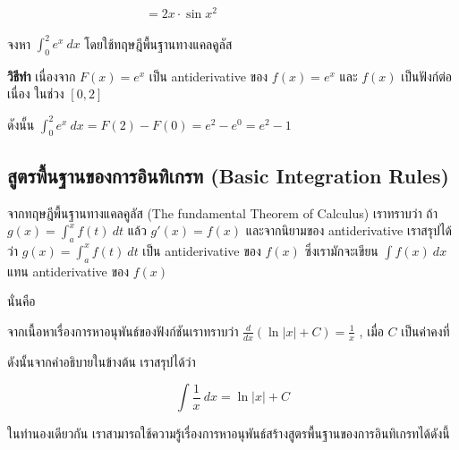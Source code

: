 \documentclass[
]{book}
\begin{document}
\(\qquad \qquad \qquad \qquad \qquad \quad =\displaystyle 2x\cdot \sin x^{2}\)

จงหา \(\displaystyle \int_{0}^{2}e^{x} \ dx\) โดยใช้ทฤษฎีพื้นฐานทางแคลคูลัส

\textbf{วิธีทำ} เนื่องจาก \(F(x)=e^{x}\) เป็น antiderivative ของ
\(f(x)=e^{x}\) และ \(f(x)\) เป็นฟังก์ต่อเนื่อง ในช่วง \([0,2]\)

ดังนั้น \(\displaystyle \int_{0}^{2}e^{x}\ dx = F(2)-F(0) =e^{2}-e^{0} =
e^{2}-1\)

\subsection{สูตรพื้นฐานของการอินทิเกรท (Basic Integration
Rules)}\label{uxe2auxe15uxe23uxe1euxe19uxe10uxe32uxe19uxe02uxe2duxe07uxe01uxe32uxe23uxe2duxe19uxe17uxe40uxe01uxe23uxe17-basic-integration-rules}

จากทฤษฎีพื้นฐานทางแคลคูลัส (The fundamental Theorem of Calculus) เราทราบว่า ถ้า
\(\displaystyle g(x)=\int_{a}^{x}f(t) \ dt\) แล้ว \(g'(x)=f(x)\)
และจากนิยามของ antiderivative เราสรุปได้ว่า
\(\displaystyle g(x)=\int_{a}^{x}f(t) \ dt\) เป็น antiderivative ของ
\(f(x)\) ซึ่งเรามักจะเขียน \(\displaystyle \int f(x) \ dx\) แทน
antiderivative ของ \(f(x)\)

นั่นคือ

จากเนื้อหาเรื่องการหาอนุพันธ์ของฟังก์ชันเราทราบว่า
\(\displaystyle \frac{d}{dx} \left( \ln |x|+C
\right)=\frac{1}{x}\) , เมื่อ \(C\) เป็นค่าคงที่

ดังนั้นจากคำอธิบายในข้างต้น เราสรุปได้ว่า

\[\displaystyle \int \frac{1}{x} \ dx = \ln|x|+C\]

ในทำนองเดียวกัน
เราสามารถใช้ความรู้เรื่องการหาอนุพันธ์สร้างสูตรพื้นฐานของการอินทิเกรทได้ดังนี้
\end{document}
